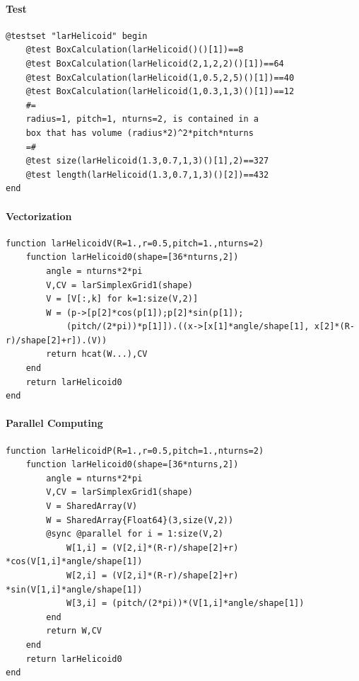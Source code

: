 \documentclass{article}
\begin{document}
\paragraph{Test}

\begin{Verbatim}
@testset "larHelicoid" begin
	@test BoxCalculation(larHelicoid()()[1])==8
	@test BoxCalculation(larHelicoid(2,1,2,2)()[1])==64
	@test BoxCalculation(larHelicoid(1,0.5,2,5)()[1])==40
	@test BoxCalculation(larHelicoid(1,0.3,1,3)()[1])==12
	#=
	radius=1, pitch=1, nturns=2, is contained in a
	box that has volume (radius*2)^2*pitch*nturns
	=#
	@test size(larHelicoid(1.3,0.7,1,3)()[1],2)==327
	@test length(larHelicoid(1.3,0.7,1,3)()[2])==432
end
\end{Verbatim}

\paragraph{Vectorization}
\begin{Verbatim}
function larHelicoidV(R=1.,r=0.5,pitch=1.,nturns=2)
    function larHelicoid0(shape=[36*nturns,2])
        angle = nturns*2*pi
        V,CV = larSimplexGrid1(shape)
        V = [V[:,k] for k=1:size(V,2)]
        W = (p->[p[2]*cos(p[1]);p[2]*sin(p[1]);
            (pitch/(2*pi))*p[1]]).((x->[x[1]*angle/shape[1], x[2]*(R-r)/shape[2]+r]).(V))
        return hcat(W...),CV
    end
    return larHelicoid0    
end
\end{Verbatim}

\paragraph{Parallel Computing} 

\begin{Verbatim}
function larHelicoidP(R=1.,r=0.5,pitch=1.,nturns=2)
    function larHelicoid0(shape=[36*nturns,2])
        angle = nturns*2*pi
        V,CV = larSimplexGrid1(shape)
        V = SharedArray(V)
        W = SharedArray{Float64}(3,size(V,2))
        @sync @parallel for i = 1:size(V,2)
            W[1,i] = (V[2,i]*(R-r)/shape[2]+r) *cos(V[1,i]*angle/shape[1])
            W[2,i] = (V[2,i]*(R-r)/shape[2]+r) *sin(V[1,i]*angle/shape[1])
            W[3,i] = (pitch/(2*pi))*(V[1,i]*angle/shape[1])
        end
        return W,CV
    end
    return larHelicoid0    
end
\end{Verbatim}
\end{document}
